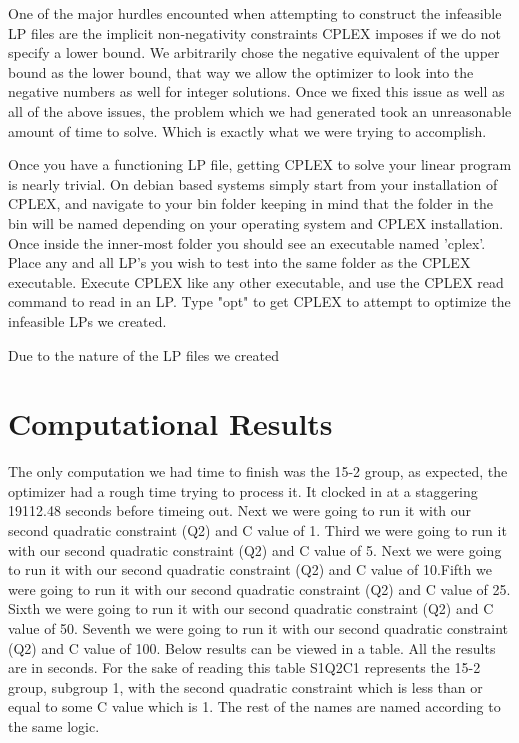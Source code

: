 \documentclass[11pt]{article} %
\theoremstyle{definition}
\theoremstyle{remark}
\begin{document}
One of the major hurdles encounted when attempting to construct the infeasible LP files are the implicit non-negativity constraints CPLEX imposes if we do not specify a lower bound.
We arbitrarily chose the negative equivalent of the upper bound as the lower bound, that way we allow the optimizer to look into the negative numbers as well for integer solutions. Once we fixed this issue as well as all of the above issues, the problem which we had generated took an unreasonable amount of time to solve. Which is exactly what we were trying to accomplish.

Once you have a functioning LP file, getting CPLEX to solve your linear program is nearly trivial. On debian based systems simply start from your installation of CPLEX, and navigate to your bin folder keeping in mind that the folder in the bin will be named depending on your operating system and CPLEX installation. Once inside the inner-most folder you should see an executable named 'cplex'. Place any and all LP's you wish to test into the same folder as the CPLEX executable. Execute CPLEX like any other executable, and use the CPLEX read command to read in an LP. Type "opt" to get CPLEX to attempt to optimize the infeasible LPs we created. 

Due to the nature of the LP files we created

\section{Computational Results}

The only computation we had time to finish was the 15-2 group, as expected, the optimizer had a rough time trying to process it. It clocked in at a staggering  19112.48 seconds before timeing out. Next we were going to run it with our second quadratic constraint (Q2) and C value of 1. Third we were going to run it with our second quadratic constraint (Q2) and C value of 5. Next we were going to run it with our second quadratic constraint (Q2) and C value of 10.Fifth we were going to run it with our second quadratic constraint (Q2) and C value of 25.  Sixth we were going to run it with our second quadratic constraint (Q2) and C value of 50. Seventh we were going to run it with our second quadratic constraint (Q2) and C value of 100. Below results can be viewed in a table. All the results are in seconds. For the sake of reading this table S1Q2C1 represents the 15-2 group, subgroup 1, with the second quadratic constraint which is less than or equal to some C value which is 1. The rest of the names are named according to the same logic.
\end{document}
